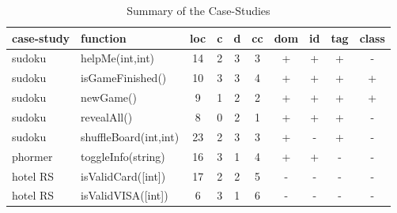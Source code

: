 \setlength\tabcolsep{1pt}
\begin{table}[!t]
  \caption{Summary of the Case-Studies}
  \label{tbl.case.studies}
    \scriptsize
    \centering
  \begin{tabular}{l|l|c|c|c|c|c|c|c|c}
    \toprule
    \textbf{case-study} & \textbf{function} & \textbf{loc} & \textbf{c} & \textbf{d} & \textbf{cc} & \textbf{dom} & \textbf{id} & \textbf{tag} & \textbf{class} \\
    \hline
    sudoku     & helpMe(int,int)    & 14 & 2 & 3 & 3 & + & + & + & - \\
    sudoku     & isGameFinished()    & 10 & 3 & 3 & 4 & + & + & + & + \\
    sudoku     & newGame()           & 9  & 1 & 2 & 2 & + & + & + & + \\
    sudoku     & revealAll()         & 8  & 0 & 2 & 1 & + & + & + & - \\
    sudoku     & shuffleBoard(int,int)      & 23 & 2 & 3 & 3 & + & - & + & - \\
    \hline
    phormer    & toggleInfo(string)                                                     & 16 & 3 & 1 & 4 & + & + & - & - \\
    \hline
    hotel RS   & isValidCard([int])           & 17 & 2 & 2 & 5 & - & - & - & - \\
    hotel RS   & isValidVISA([int])           & 6  & 3 & 1 & 6 & - & - & - & - \\

\end{tabular}
\end{table}
